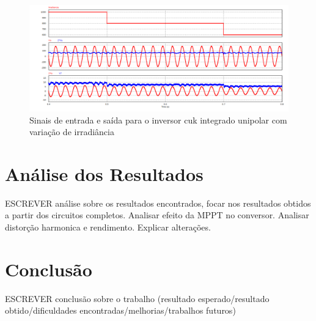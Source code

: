 \documentclass[
	12pt,				%
	openany,
	onseside,
	a4paper,			%
	english,			%
	french,				%
	spanish,			%
	brazil,				%
	]{abntex2}
\begin{document}
\begin{figure}[H]%
	\captionsetup{justification=centering}
	\centering
		\includegraphics[width= \linewidth]{comp_integ_var_s_unip}
		\caption{Sinais de entrada e saída para o inversor cuk integrado unipolar com variação de irradiância}
		\label{fig:comp_integ_var_s_unip}
\end{figure}


\chapter{Análise dos Resultados}

ESCREVER análise sobre os resultados encontrados, focar nos resultados obtidos a partir dos circuitos completos. Analisar efeito da MPPT no conversor. Analisar distorção harmonica e rendimento. Explicar alterações.

\chapter{Conclusão}

ESCREVER conclusão sobre o trabalho (resultado esperado/resultado obtido/dificuldades encontradas/melhorias/trabalhos futuros)






% 

\postextual
\end{document}
